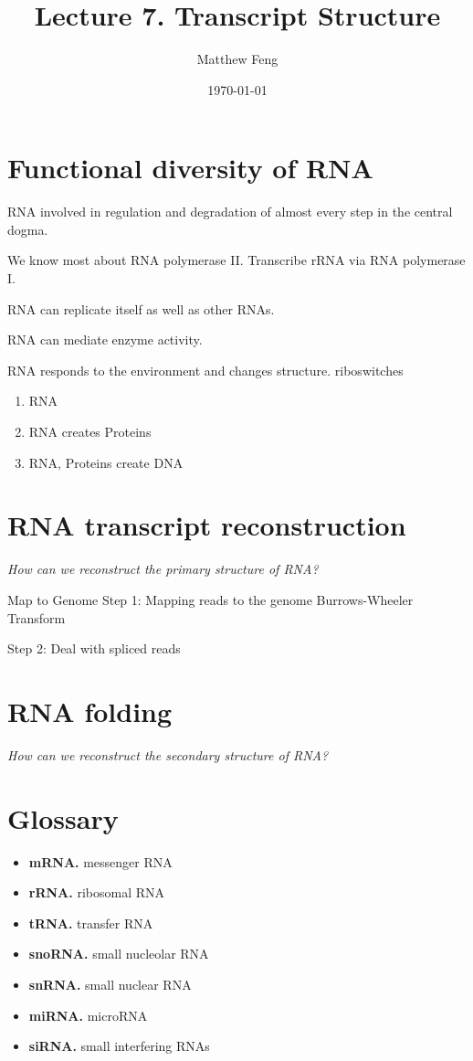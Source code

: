 \documentclass[a4paper,10pt]{article}
\title{Lecture 7. Transcript Structure}
\date{\today}
\author{Matthew Feng}
\begin{document}
\maketitle


\section{Functional diversity of RNA}

RNA involved in regulation and degradation of
almost every step in the central dogma.

We know most about RNA polymerase II.
Transcribe rRNA via RNA polymerase I.

RNA can replicate itself as well as other RNAs.

RNA can mediate enzyme activity.

RNA responds to the environment and changes structure.
riboswitches

\begin{enumerate}[noitemsep]
\item RNA
\item RNA creates Proteins
\item RNA, Proteins create DNA
\end{enumerate}

\section{RNA transcript reconstruction}
{\it
How can we reconstruct the primary structure of RNA?
}

Map to Genome
Step 1: Mapping reads to the genome
Burrows-Wheeler Transform

Step 2: Deal with spliced reads

\section{RNA folding}
{\it
How can we reconstruct the secondary structure of RNA?
}

\section{Glossary}
\begin{itemize}[noitemsep, leftmargin=0em]
\item[] {\bf mRNA.} messenger RNA
\item[] {\bf rRNA.} ribosomal RNA
\item[] {\bf tRNA.} transfer RNA
\item[] {\bf snoRNA.} small nucleolar RNA
\item[] {\bf snRNA.} small nuclear RNA
\item[] {\bf miRNA.} microRNA
\item[] {\bf siRNA.} small interfering RNAs
\end{itemize}
\end{document}
